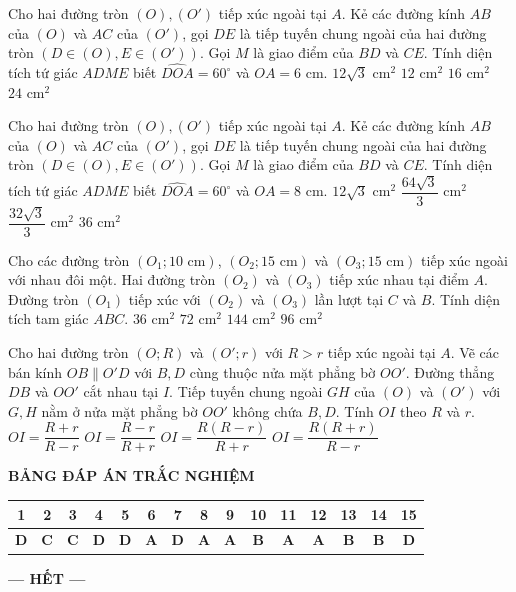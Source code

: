 \documentclass[11pt,a4paper]{article}
\begin{document}
\begin{ex}
Cho hai đường tròn $(O), (O')$ tiếp xúc ngoài tại $A$. Kẻ các đường kính $AB$ của $(O)$ và $AC$ của $(O')$, gọi $DE$ là tiếp tuyến chung ngoài của hai đường tròn $(D \in (O), E \in (O'))$. Gọi $M$ là giao điểm của $BD$ và $CE$. Tính diện tích tứ giác $ADME$ biết $\widehat{DOA} = 60^\circ$ và $OA = 6\text{ cm}$.
\choice
{\True $12\sqrt{3}\text{ cm}^2$}
{$12\text{ cm}^2$}
{$16\text{ cm}^2$}
{$24\text{ cm}^2$}
\loigiai{}
\end{ex}

\begin{ex}
Cho hai đường tròn $(O), (O')$ tiếp xúc ngoài tại $A$. Kẻ các đường kính $AB$ của $(O)$ và $AC$ của $(O')$, gọi $DE$ là tiếp tuyến chung ngoài của hai đường tròn $(D \in (O), E \in (O'))$. Gọi $M$ là giao điểm của $BD$ và $CE$. Tính diện tích tứ giác $ADME$ biết $\widehat{DOA} = 60^\circ$ và $OA = 8\text{ cm}$.
\choice
{$12\sqrt{3}\text{ cm}^2$}
{\True $\dfrac{64\sqrt{3}}{3}\text{ cm}^2$}
{$\dfrac{32\sqrt{3}}{3}\text{ cm}^2$}
{$36\text{ cm}^2$}
\loigiai{}
\end{ex}

\begin{ex}
Cho các đường tròn $(O_1; 10\text{ cm})$, $(O_2; 15\text{ cm})$ và $(O_3; 15\text{ cm})$ tiếp xúc ngoài với nhau đôi một. Hai đường tròn $(O_2)$ và $(O_3)$ tiếp xúc nhau tại điểm $A$. Đường tròn $(O_1)$ tiếp xúc với $(O_2)$ và $(O_3)$ lần lượt tại $C$ và $B$. Tính diện tích tam giác $ABC$.
\choice
{$36\text{ cm}^2$}
{\True $72\text{ cm}^2$}
{$144\text{ cm}^2$}
{$96\text{ cm}^2$}
\loigiai{}
\end{ex}

\begin{ex}
Cho hai đường tròn $(O; R)$ và $(O'; r)$ với $R > r$ tiếp xúc ngoài tại $A$. Vẽ các bán kính $OB \parallel O'D$ với $B, D$ cùng thuộc nửa mặt phẳng bờ $OO'$. Đường thẳng $DB$ và $OO'$ cắt nhau tại $I$. Tiếp tuyến chung ngoài $GH$ của $(O)$ và $(O')$ với $G, H$ nằm ở nửa mặt phẳng bờ $OO'$ không chứa $B, D$. Tính $OI$ theo $R$ và $r$.
\choice
{$OI = \dfrac{R+r}{R-r}$}
{$OI = \dfrac{R-r}{R+r}$}
{$OI = \dfrac{R(R-r)}{R+r}$}
{\True $OI = \dfrac{R(R+r)}{R-r}$}
\loigiai{}
\end{ex}

\vspace{0.4cm}
\begin{center}
\textbf{BẢNG ĐÁP ÁN TRẮC NGHIỆM} \\[0.2cm]
\begin{tabular}{|c|c|c|c|c|c|c|c|c|c|c|c|c|c|c|}
\hline
\textbf{1} & \textbf{2} & \textbf{3} & \textbf{4} & \textbf{5} & \textbf{6} & \textbf{7} & \textbf{8} & \textbf{9} & \textbf{10} & \textbf{11} & \textbf{12} & \textbf{13} & \textbf{14} & \textbf{15} \\
\hline
\textbf{D} & \textbf{C} & \textbf{C} & \textbf{D} & \textbf{D} & \textbf{A} & \textbf{D} & \textbf{A} & \textbf{A} & \textbf{B} & \textbf{A} & \textbf{A} & \textbf{B} & \textbf{B} & \textbf{D} \\
\hline
\end{tabular}
\end{center}

\vspace{0.3cm}
\begin{center}
\textbf{--- HẾT ---}
\end{center}
\end{document}
